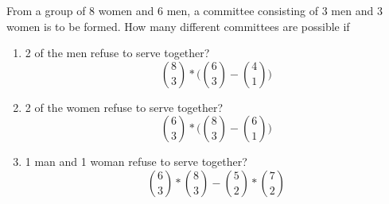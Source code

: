 \item From a group of 8 women and 6 men, a committee consisting of 3 men and 3 women is to be formed. How many different committees are possible if
\begin{enumerate}
    \item  2 of the men refuse to serve together?
    \[ \binom{8}{3} * \Bigg(\binom{6}{3} - \binom{4}{1}\Bigg) \]
    \item 2 of the women refuse to serve together?
    \[ \binom{6}{3} * \Bigg(\binom{8}{3} - \binom{6}{1}\Bigg) \]
    \item 1 man and 1 woman refuse to serve together?
    \[ \binom{6}{3} * \binom{8}{3} - \binom{5}{2} * \binom{7}{2} \]
\end{enumerate}